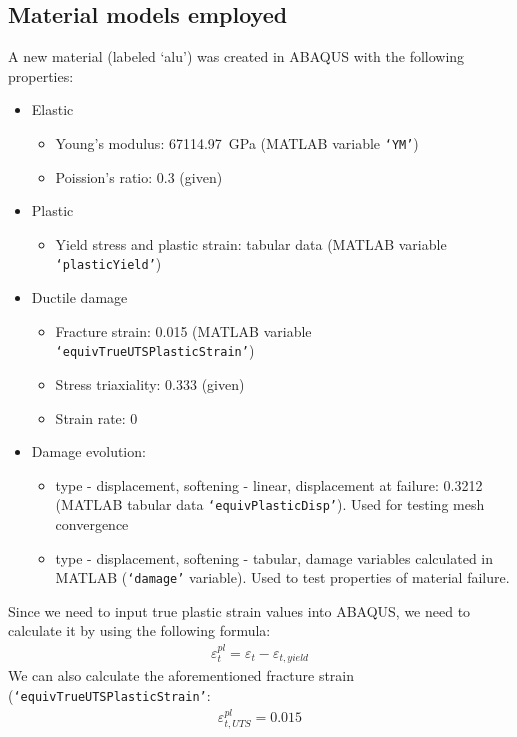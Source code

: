\documentclass[11pt]{article}
\numberwithin{equation}{section}
\begin{document}
\subsection{Material models employed}
A new material (labeled `alu') was created in ABAQUS with the following properties:
\begin{itemize}
    \item Elastic
    \begin{itemize}
        \item Young's modulus: \SI{67114.97}{\giga\pascal} (MATLAB variable \texttt{`YM'})
        \item Poission's ratio: 0.3 (given)
    \end{itemize}
    \item Plastic
    \begin{itemize}
        \item Yield stress and plastic strain: tabular data (MATLAB variable \texttt{`plasticYield'})
    \end{itemize}
    \item Ductile damage
    \begin{itemize}
        \item Fracture strain: 0.015 (MATLAB variable \texttt{`equivTrueUTSPlasticStrain'})
        \item Stress triaxiality: 0.333 (given)
        \item Strain rate: 0
    \end{itemize}
    \item Damage evolution: 
    \begin{itemize}
        \item type - displacement, softening - linear, displacement at failure: 0.3212 (MATLAB tabular data \texttt{`equivPlasticDisp'}). Used for testing mesh convergence
        \item type - displacement, softening - tabular, damage variables calculated in MATLAB (\texttt{`damage'} variable). Used to test properties of material failure.
    \end{itemize}
\end{itemize}
Since we need to input true plastic strain values into ABAQUS, we need to calculate it by using the following formula:
\begin{gather}
    \varepsilon^{pl}_t = \varepsilon_t - \varepsilon_{t,yield}
\end{gather}
We can also calculate the aforementioned fracture strain (\texttt{`equivTrueUTSPlasticStrain'}:
\begin{gather}
    \varepsilon^{pl}_{t,UTS} = 0.015 
\end{gather}
\end{document}
